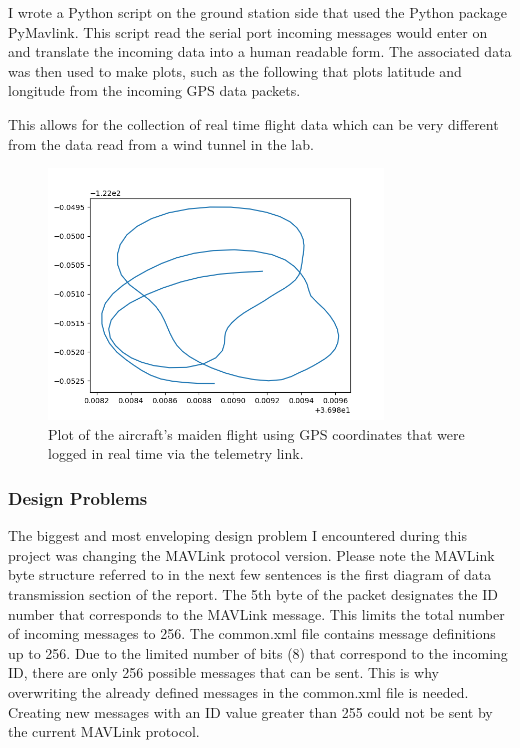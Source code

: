 \documentclass[12pt,journal,compsoc]{IEEEtran}
\begin{document}
I wrote a Python script on the ground station side that used the Python package PyMavlink. This script read the serial port incoming messages would enter on and translate the incoming data into a human readable form. The associated data was then used to make plots, such as the following that plots latitude and longitude from the incoming GPS data packets.

This allows for the collection of real time flight data which can be very different from the data read from a wind tunnel in the lab. 
\begin{figure}[h!]
\hspace*{0cm}
\centering
\includegraphics[width=3.5in]{flight02-22-2019_maiden.png}
\caption{Plot of the aircraft's maiden flight using GPS coordinates that were logged in real time via the telemetry link.}
\label{maidenFlightPlot}
\end{figure}


\subsubsection{Design Problems}
The biggest and most enveloping design problem I encountered during this project was changing the MAVLink protocol version. Please note the MAVLink byte structure referred to in the next few sentences is the first diagram of data transmission section of the report. The 5th byte of the packet designates the ID number that corresponds to the MAVLink message. This limits the total number of incoming messages to 256. The common.xml file contains message definitions up to 256. Due to the limited number of bits (8) that correspond to the incoming ID, there are only 256 possible messages that can be sent. This is why overwriting the already defined messages in the common.xml file is needed. Creating new messages with an ID value greater than 255 could not be sent by the current MAVLink protocol. 
\end{document}
